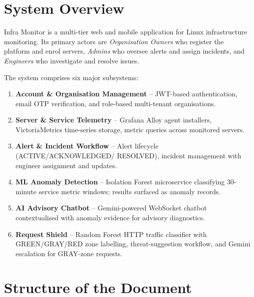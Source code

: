 \section{System Overview}

Infra Monitor is a multi-tier web and mobile application for Linux infrastructure
monitoring.  Its primary actors are \textit{Organisation Owners} who register
the platform and enrol servers, \textit{Admins} who oversee alerts and assign
incidents, and \textit{Engineers} who investigate and resolve issues.

The system comprises six major subsystems:

\begin{enumerate}[leftmargin=2em]
  \item \textbf{Account \& Organisation Management} -- JWT-based authentication,
        email OTP verification, and role-based multi-tenant organisations.
  \item \textbf{Server \& Service Telemetry} -- Grafana Alloy agent installers,
        VictoriaMetrics time-series storage, metric queries
        across monitored servers.
  \item \textbf{Alert \& Incident Workflow} -- Alert lifecycle (ACTIVE/ACKNOWLEDGED/
        RESOLVED), incident management with engineer assignment and updates.
  \item \textbf{ML Anomaly Detection} -- Isolation Forest microservice classifying
        30-minute service metric windows; results surfaced as anomaly records.
  \item \textbf{AI Advisory Chatbot} -- Gemini-powered WebSocket chatbot
        contextualised with anomaly evidence for advisory diagnostics.
  \item \textbf{Request Shield} -- Random Forest HTTP traffic classifier with
        GREEN/GRAY/RED zone labelling, threat-suggestion workflow, and Gemini
        escalation for GRAY-zone requests.
\end{enumerate}

\section{Structure of the Document}


